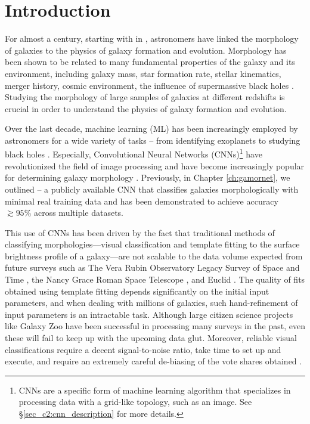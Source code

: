 \section{Introduction} \label{sec_c2:intro}
For almost a century, starting with \citeauthor{hubble_1926} in \citeyear{hubble_1926}, astronomers have linked the morphology of galaxies to the physics of  galaxy formation and evolution. Morphology has been shown to be related to many fundamental properties of the galaxy and its environment, including galaxy mass, star formation rate, stellar kinematics, merger history, cosmic environment, the influence of supermassive black holes \citep[e.g.,][]{Bender1992DynamicallyProperties,Tremaine2002TheCorrelation,pozzetti_10, wuyts_11, Schawinski2014TheGalaxies, Huertas-Company2016MassCANDELS,powell_17, shimakawa_2021, Dimauro2022CoincidenceGrowth}. Studying the morphology of large samples of galaxies at different redshifts is crucial in order to understand the physics of galaxy formation and evolution. 

Over the last decade, machine learning (ML) has been increasingly employed by astronomers for a wide variety of tasks -- from identifying exoplanets to studying black holes \citep[e.g.,][]{ml_pz,ml_sz,Shallue2018IdentifyingKepler-90,Sharma2020ApplicationClassification,Natarajan2021QuasarNet:Holes}. Especially, Convolutional Neural Networks (CNNs)\footnote{CNNs are a specific form of machine learning algorithm that specializes in processing data with a grid-like topology, such as an image. See \S \ref{sec_c2:cnn_description} for more details.} have revolutionized the field of image processing and have become increasingly popular for determining galaxy morphology \citep[e.g.,][]{Dieleman2015Rotation-invariantPrediction, Huertas-Company2015ALEARNING, Tuccillo2018DeepFitting, Hausen2020MorpheusData, Walmsley2020GalaxyLearning, Cheng2021GalaxyNetworks, Vega-Ferrero2021PushingSurvey, Tarsitano2022ImageLearning}. Previously, in Chapter \ref{ch:gamornet}, we outlined \gamornet{} -- a publicly available CNN that classifies galaxies morphologically with minimal real training data and has been demonstrated to achieve accuracy $\gtrsim 95\%$ across multiple datasets. 

This use of CNNs has been driven by the fact that traditional methods of classifying morphologies---visual classification and template fitting to the surface brightness profile of a galaxy---are not scalable to the data volume expected from future surveys such as The Vera Rubin Observatory Legacy Survey of Space and Time \citep[LSST;][]{lsst}, the Nancy Grace Roman Space Telescope \citep[NGRST;][]{ngrst}, and Euclid \citep{euclid}. The quality of fits obtained using template fitting depends significantly on the initial input parameters, and when dealing with millions of galaxies, such hand-refinement of input parameters is an intractable task. Although large citizen science projects like Galaxy Zoo \citep{gzoo_original} have been successful in processing many surveys in the past, even these will fail to keep up with the upcoming data glut. Moreover, reliable visual classifications require a decent signal-to-noise ratio, take time to set up and execute, and require an extremely careful de-biasing of the vote shares obtained \citep[e.g.,][]{gzoo_original,gzoo_candels}. 

